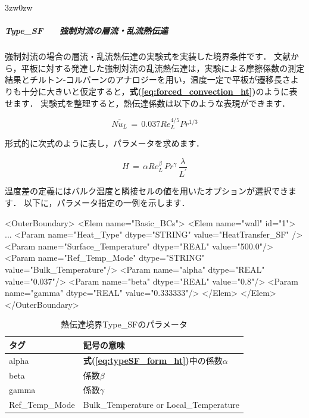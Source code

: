 \begin{indentation}{3zw}{0zw}
%
\subparagraph{Type\_SF　　強制対流の層流・乱流熱伝達}
強制対流の場合の層流・乱流熱伝達の実験式を実装した境界条件です．
文献\cite{shouji:95:Dennetsu}から，平板に対する発達した強制対流の乱流熱伝達は，実験による摩擦係数の測定結果とチルトン-コルバーンのアナロジーを用い，温度一定で平板が遷移長さよりも十分に大きいと仮定すると，\textbf{式(\ref{eq:forced_convection_ht})}のように表せます．
実験式を整理すると，熱伝達係数は以下のような表現ができます．

\begin{equation}
\overline{Nu_L} \,=\, 0.037Re_L^{4/5}Pr^{1/3}
\label{eq:forced_convection_ht}
\end{equation}

形式的に次式のように表し，パラメータを求めます．

\begin{equation}
H \,=\, \alpha Re_L^\beta \, Pr^\gamma \, \frac{\lambda}{L^\prime}
\label{eq:typeSF_form_ht}
\end{equation}


温度差の定義にはバルク温度と隣接セルの値を用いたオプションが選択できます．
以下に，パラメータ指定の一例を示します．

{\small
\begin{program}
<OuterBoundary>
  <Elem name="Basic_BCs">
    <Elem name="wall" id="1">
      ...
      <Param name="Heat_Type"           dtype="STRING" value="HeatTransfer_SF" />
      <Param name="Surface_Temperature" dtype="REAL"   value="500.0"/>
      <Param name="Ref_Temp_Mode"       dtype="STRING" value="Bulk_Temperature"/>
      <Param name="alpha"               dtype="REAL"   value="0.037"/>
      <Param name="beta"                dtype="REAL"   value="0.8"/>
      <Param name="gamma"               dtype="REAL"   value="0.333333"/>
    </Elem>
  </Elem>
</OuterBoundary>
\end{program}
}

\begin{table}[htdp]
\caption{熱伝達境界Type\_SFのパラメータ}
\begin{center}
\small
\begin{tabular}{ll}\toprule
タグ & 記号の意味\\ \midrule
alpha & \textbf{式(\ref{eq:typeSF_form_ht})}中の係数$\alpha$\\
beta & 係数$\beta$\\
gamma & 係数$\gamma$\\
Ref\_Temp\_Mode & Bulk\_Temperature or Local\_Temperature\\ \bottomrule
\end{tabular}
\end{center}
\label{tbl:htsf}
\end{table}



\end{indentation}
